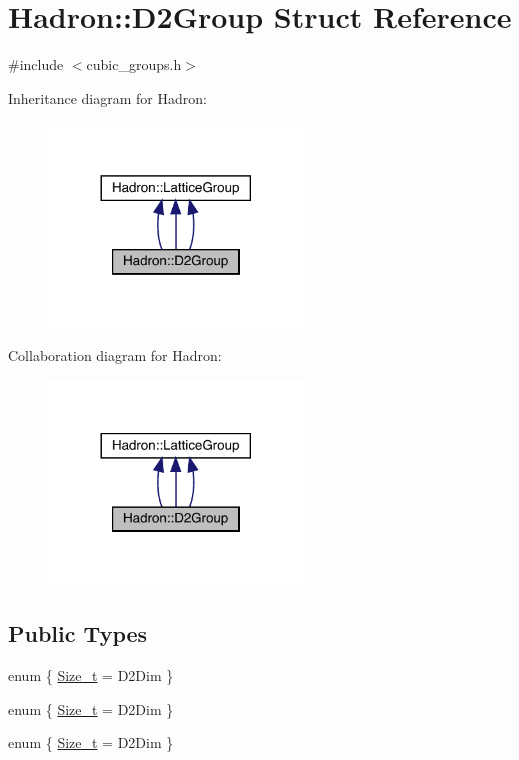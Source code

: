 \hypertarget{structHadron_1_1D2Group}{}\section{Hadron\+:\+:D2\+Group Struct Reference}
\label{structHadron_1_1D2Group}


{\ttfamily \#include $<$cubic\+\_\+groups.\+h$>$}



Inheritance diagram for Hadron\+:
\nopagebreak
\begin{figure}[H]
\begin{center}
\leavevmode
\includegraphics[width=192pt]{d6/df0/structHadron_1_1D2Group__inherit__graph}
\end{center}
\end{figure}


Collaboration diagram for Hadron\+:
\nopagebreak
\begin{figure}[H]
\begin{center}
\leavevmode
\includegraphics[width=192pt]{d8/d62/structHadron_1_1D2Group__coll__graph}
\end{center}
\end{figure}
\subsection*{Public Types}
\begin{DoxyCompactItemize}
\item 
enum \{ \mbox{\hyperlink{structHadron_1_1D2Group_a47bf6ba7a083833cb5d8a03aae843999ac83117b5f0225cc78e299acc4b82da56}{Size\+\_\+t}} = D2\+Dim
 \}
\item 
enum \{ \mbox{\hyperlink{structHadron_1_1D2Group_a47bf6ba7a083833cb5d8a03aae843999ac83117b5f0225cc78e299acc4b82da56}{Size\+\_\+t}} = D2\+Dim
 \}
\item 
enum \{ \mbox{\hyperlink{structHadron_1_1D2Group_a47bf6ba7a083833cb5d8a03aae843999ac83117b5f0225cc78e299acc4b82da56}{Size\+\_\+t}} = D2\+Dim
 \}
\end{DoxyCompactItemize}
